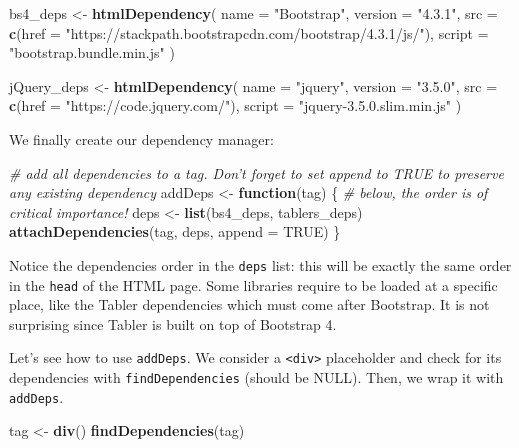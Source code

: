\documentclass[
]{book}
\newenvironment{Shaded}{\begin{snugshade}}{\end{snugshade}}
\newcommand{\CommentTok}[1]{\textcolor[rgb]{0.56,0.35,0.01}{\textit{#1}}}
\newcommand{\ControlFlowTok}[1]{\textcolor[rgb]{0.13,0.29,0.53}{\textbf{#1}}}
\newcommand{\DataTypeTok}[1]{\textcolor[rgb]{0.13,0.29,0.53}{#1}}
\newcommand{\KeywordTok}[1]{\textcolor[rgb]{0.13,0.29,0.53}{\textbf{#1}}}
\newcommand{\NormalTok}[1]{#1}
\newcommand{\OtherTok}[1]{\textcolor[rgb]{0.56,0.35,0.01}{#1}}
\newcommand{\StringTok}[1]{\textcolor[rgb]{0.31,0.60,0.02}{#1}}
\begin{document}
\begin{Shaded}
\begin{Highlighting}[]
\NormalTok{bs4_deps <-}\StringTok{ }\KeywordTok{htmlDependency}\NormalTok{(}
  \DataTypeTok{name =} \StringTok{"Bootstrap"}\NormalTok{,}
  \DataTypeTok{version =} \StringTok{"4.3.1"}\NormalTok{,}
  \DataTypeTok{src =} \KeywordTok{c}\NormalTok{(}\DataTypeTok{href =} \StringTok{"https://stackpath.bootstrapcdn.com/bootstrap/4.3.1/js/"}\NormalTok{),}
  \DataTypeTok{script =} \StringTok{"bootstrap.bundle.min.js"}
\NormalTok{)}

\NormalTok{jQuery_deps <-}\StringTok{ }\KeywordTok{htmlDependency}\NormalTok{(}
  \DataTypeTok{name =} \StringTok{"jquery"}\NormalTok{,}
  \DataTypeTok{version =} \StringTok{"3.5.0"}\NormalTok{,}
  \DataTypeTok{src =} \KeywordTok{c}\NormalTok{(}\DataTypeTok{href =} \StringTok{"https://code.jquery.com/"}\NormalTok{),}
  \DataTypeTok{script =} \StringTok{"jquery-3.5.0.slim.min.js"}
\NormalTok{)}
\end{Highlighting}
\end{Shaded}

We finally create our dependency manager:

\begin{Shaded}
\begin{Highlighting}[]
\CommentTok{# add all dependencies to a tag. Don't forget to set append to TRUE to preserve any existing dependency}
\NormalTok{addDeps <-}\StringTok{ }\ControlFlowTok{function}\NormalTok{(tag) \{}
  \CommentTok{# below, the order is of critical importance!}
\NormalTok{  deps <-}\StringTok{ }\KeywordTok{list}\NormalTok{(bs4_deps, tablers_deps)}
  \KeywordTok{attachDependencies}\NormalTok{(tag, deps, }\DataTypeTok{append =} \OtherTok{TRUE}\NormalTok{)}
\NormalTok{\}}
\end{Highlighting}
\end{Shaded}

Notice the dependencies order in the \texttt{deps} list: this will be exactly the same order in the \texttt{head} of the HTML page. Some libraries require to be loaded at a specific place, like the Tabler dependencies which must come after Bootstrap.
It is not surprising since Tabler is built on top of Bootstrap 4.

Let's see how to use \texttt{addDeps}. We consider a \texttt{\textless{}div\textgreater{}} placeholder and check for its dependencies with \texttt{findDependencies} (should be NULL). Then, we wrap it with \texttt{addDeps}.

\begin{Shaded}
\begin{Highlighting}[]
\NormalTok{tag <-}\StringTok{ }\KeywordTok{div}\NormalTok{()}
\KeywordTok{findDependencies}\NormalTok{(tag)}
\end{Highlighting}
\end{Shaded}
\end{document}
